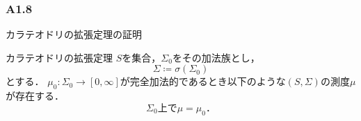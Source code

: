 \documentclass{jsarticle}
\begin{document}
\subsubsection*{A1.8}
カラテオドリの拡張定理の証明

\begin{itembox}[l]{カラテオドリの拡張定理}
    $S$を集合，$\Sigma_0$をその加法族とし，
    \begin{equation}
        \Sigma\coloneqq\sigma(\Sigma_0) \nonumber
    \end{equation}
    とする．
    $\mu_0:\Sigma_0\to[0,\infty]$が完全加法的であるとき以下のような$(S,\Sigma)$の測度$\mu$が存在する．
    \begin{equation}
        \Sigma_0 上で \mu=\mu_0 ． \nonumber
    \end{equation}
\end{itembox}
\end{document}
